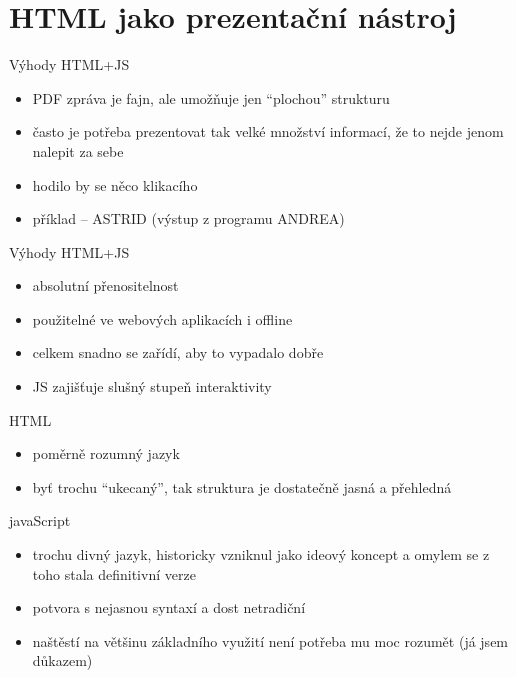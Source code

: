 \documentclass{beamer}
\begin{document}
\section{HTML jako prezentační nástroj}

\begin{frame}{Výhody HTML+JS}
  \begin{itemize}
    \item PDF zpráva je fajn, ale umožňuje jen ``plochou'' strukturu
    \item často je potřeba prezentovat tak velké množství informací, že to nejde jenom nalepit za sebe
    \item hodilo by se něco klikacího
    \item příklad -- ASTRID (výstup z programu ANDREA)
  \end{itemize}
\end{frame}

\begin{frame}{Výhody HTML+JS}
  \begin{itemize}
    \item absolutní přenositelnost
    \item použitelné ve webových aplikacích i offline
    \item celkem snadno se zařídí, aby to vypadalo dobře
    \item JS zajišťuje slušný stupeň interaktivity
  \end{itemize}
\end{frame}

\begin{frame}{HTML}
  \begin{itemize}
    \item poměrně rozumný jazyk
    \item byť trochu ``ukecaný'', tak struktura je dostatečně jasná a přehledná
  \end{itemize}
\end{frame}

\begin{frame}{javaScript}
  \begin{itemize}
    \item trochu divný jazyk, historicky vzniknul jako ideový koncept a omylem se z toho stala definitivní verze
    \item potvora s nejasnou syntaxí a dost netradiční
    \item naštěstí na většinu základního využití není potřeba mu moc rozumět (já jsem důkazem)
  \end{itemize}
\end{frame}
\end{document}
